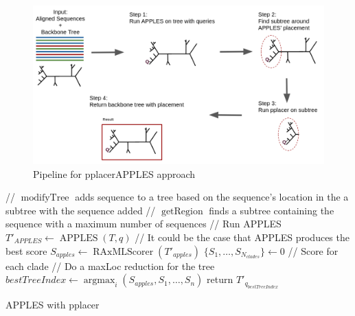 \documentclass[10pt]{article}
\begin{document}
\begin{figure}[!htb]
\centering
\includegraphics[width=\textwidth]{Figs/pplacerAPPLESpipeline.png}
\caption{Pipeline for pplacerAPPLES approach
\label{fig:pplacerAPPLES-pipeline}
}
\end{figure}

\begin{algorithm}[!htb]
\SetAlgoLined
{}
 // $\operatorname{modifyTree}$ adds sequence to a tree based on the sequence's location in the a subtree with the sequence added\;
 // $\operatorname{getRegion}$ finds a subtree containing the sequence with a maximum number of sequences\;
  // Run APPLES\;
  $T'_{APPLES} \leftarrow \operatorname{APPLES}(T, q)$\;
  // It could be the case that APPLES produces the best score\;
  $S_{apples} \leftarrow \operatorname{RAxMLScorer}( T'_{apples})$\;
  $\{S_1, \dots, S_{N_{clades}}\} \leftarrow 0$ // Score for each clade\;
 // Do a maxLoc reduction for the tree\;
 $bestTreeIndex \leftarrow \operatorname{argmax}_{i} (S_{apples},S_1,\dots,S_n)$\;
 return $T'_{q_{bestTreeIndex}}$\;
\caption{APPLES with pplacer}
 \label{alg:approach2}
\end{algorithm}
\end{document}
